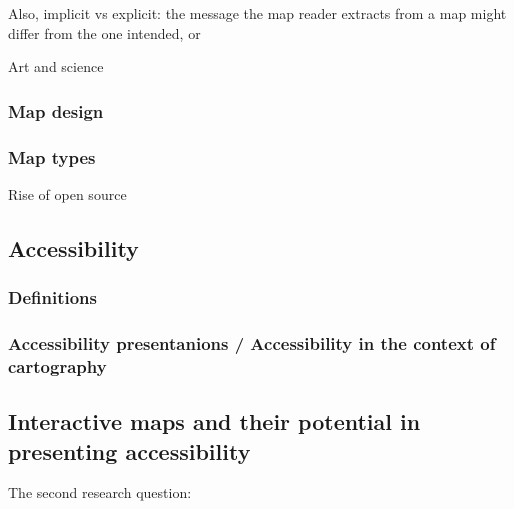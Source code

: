 \documentclass[12pt]{article}
\begin{document}
Also, implicit vs explicit:
the message the map reader extracts from a map might differ from the one intended, or


Art and science \parencite{mac2004, tyn1992}  %

\subsubsection{Map design}

\subsubsection{Map types}


Rise of open source \textcite{pet2015}


\textcite{rot2013a, rot2013b}


\subsection{Accessibility}

\subsubsection{Definitions}

\subsubsection{Accessibility presentanions / Accessibility in the context of cartography}




\subsection{Interactive maps and their potential in presenting accessibility}
The second research question:
\end{document}
